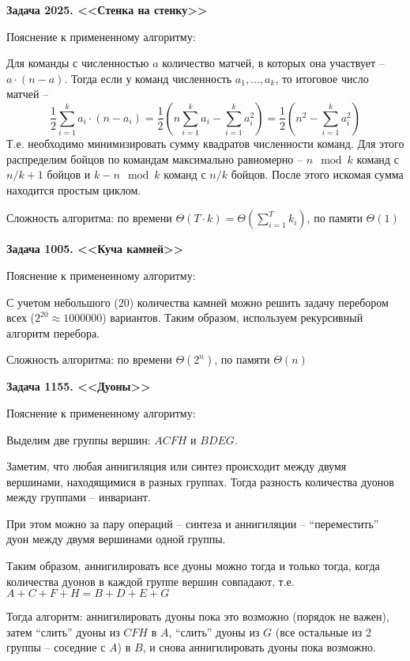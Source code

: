 \documentclass[12pt,a4paper]{article}
\begin{document}
    \newcommand{\LabNumber}{1}
    

    \textbf{Задача 2025. <<Стенка на стенку>>}

    Пояснение к примененному алгоритму:

    Для команды с численностью $a$ количество матчей, в которых она участвует -- $a\cdot(n-a)$.
    Тогда если у команд численность $a_1,\dots,a_k$, то итоговое число матчей --
    \[ \frac{1}{2}\sum_{i=1}^k a_i\cdot(n-a_i)
    =\frac{1}{2}\left(n\sum_{i=1}^k a_i-\sum_{i=1}^k a_i^2\right)
    =\frac{1}{2}\left(n^2-\sum_{i=1}^k a_i^2\right) \]
    Т.е. необходимо минимизировать сумму квадратов численности команд.
    Для этого распределим бойцов по командам максимально равномерно --
    $n\mod k$ команд с $n/k+1$ бойцов и $k-n\mod k$ команд с $n/k$ бойцов.
    После этого искомая сумма находится простым циклом.

    Сложность алгоритма: по времени $\Theta(T\cdot k)=\Theta(\sum_{i=1}^T k_i)$, по памяти $\Theta(1)$

    \bigskip
    \textbf{Задача 1005. <<Куча камней>>}

    Пояснение к примененному алгоритму:

    С учетом небольшого ($20$) количества камней можно решить задачу перебором всех ($2^{20}\approx 1000000$) вариантов.
    Таким образом, используем рекурсивный алгоритм перебора.

    Сложность алгоритма: по времени $\Theta(2^n)$, по памяти $\Theta(n)$

    \bigskip
    \textbf{Задача 1155. <<Дуоны>>}

    Пояснение к примененному алгоритму:

    Выделим две группы вершин: $ACFH$ и $BDEG$.

    Заметим, что любая аннигиляция или синтез происходит между двумя вершинами, находящимися в разных группах.
    Тогда разность количества дуонов между группами -- инвариант.

    При этом можно за пару операций -- синтеза и аннигиляции -- ``переместить'' дуон между двумя вершинами одной группы.

    Таким образом, аннигилировать все дуоны можно тогда и только тогда, когда количества дуонов в каждой группе вершин совпадают,
    т.е. $A+C+F+H=B+D+E+G$

    Тогда алгоритм: аннигилировать дуоны пока это возможно (порядок не важен),
    затем ``слить'' дуоны из $CFH$ в $A$,
    ``слить'' дуоны из $G$ (все остальные из 2 группы -- соседние с $A$) в $B$,
    и снова аннигилировать дуоны пока возможно.
\end{document}

